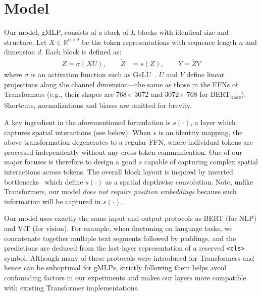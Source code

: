 \documentclass{article}
\newcommand{\gffn}{gMLP\xspace}
\begin{document}
\section{Model}

Our model, \gffn, consists of a stack of $L$ blocks with identical size and structure.
Let $X \in \mathbb{R}^{n \times d}$ be the token representations with sequence length $n$ and dimension $d$.
Each block is defined as:
\begin{align}
Z = \sigma(XU), \qquad
\tilde{Z} &= s(Z), \qquad
Y = \tilde{Z}V
\end{align}
where $\sigma$ is an activation function such as GeLU~\cite{hendrycks2016gaussian}.
$U$ and $V$ define linear projections along the channel dimension---the same as those in the FFNs of Transformers (e.g., their shapes are 768$\times$ 3072 and 3072$\times$ 768 for BERT\textsubscript{base}).
Shortcuts, normalizations and biases are omitted for brevity.

A key ingredient in the aforementioned formulation is $s(\cdot)$,
a layer which captures spatial interactions (see below).
When $s$ is an identity mapping,
the above transformation degenerates to a regular FFN, where individual tokens are processed independently without any cross-token communication.
One of our major focuses
is therefore to design a good $s$ capable of capturing complex spatial interactions across tokens.
The overall block layout is inspired by inverted bottlenecks~\cite{sandler2018mobilenetv2} which define $s(\cdot)$ as a spatial depthwise convolution.
Note, unlike Transformers, our model \emph{does not require position embeddings} because such information will be captured in $s(\cdot)$.

Our model uses exactly the same input and output protocols as BERT (for NLP) and ViT (for vision).
For example,
when finetuning on language tasks, we concatenate together multiple text segments followed by paddings,
and the predictions are deduced from the last-layer representation of a reserved \texttt{<cls>} symbol.
Although many of these protocols were introduced for Transformers and hence can be suboptimal for \gffn{s}, strictly following them helps avoid confounding factors in our experiments and makes our layers more compatible with existing Transformer implementations.
\end{document}
